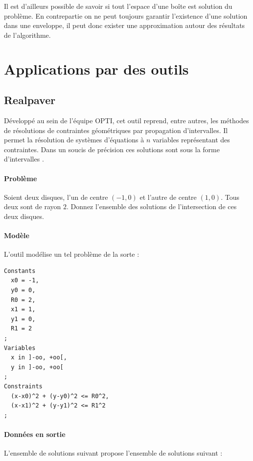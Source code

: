 
 Il est d'ailleurs possible de savoir si tout l'espace d'une boîte est solution du problème. En contrepartie on ne peut toujours garantir l'existence d'une solution dans une enveloppe, il peut donc exister une approximation autour des résultats de l'algorithme.

\clearpage
 
 \section{Applications par des outils}
\subsection{Realpaver}\label{realp}
Développé  au sein de l'équipe \textsc{OPTI}, cet outil reprend, entre autres, les méthodes de résolutions de contraintes géométriques par propagation d'intervalles. Il permet la résolution de systèmes d'équations à $n$ variables représentant des contraintes. Dans un soucis de précision ces solutions sont sous la forme d'intervalles \cite{realpaver}.%
\paragraph{Problème}
Soient deux disques, l'un de centre $(-1,0)$ et l'autre de centre $(1,0)$. Tous deux sont de rayon $2$. Donnez l'ensemble des solutions de l'intersection de ces deux disques.
\paragraph{Modèle}
L'outil \realpaver{}  modélise un tel problème de la sorte :
\label{realprob}
\begin{verbatim} 
Constants
  x0 = -1,
  y0 = 0,
  R0 = 2,
  x1 = 1,
  y1 = 0,
  R1 = 2
;
Variables
  x in ]-oo, +oo[,
  y in ]-oo, +oo[
;
Constraints
  (x-x0)^2 + (y-y0)^2 <= R0^2,
  (x-x1)^2 + (y-y1)^2 <= R1^2
;
\end{verbatim}
\paragraph{Données en sortie}\label{par:out}
L'ensemble de solutions suivant \realpaver{} propose l'ensemble de solutions suivant : 

